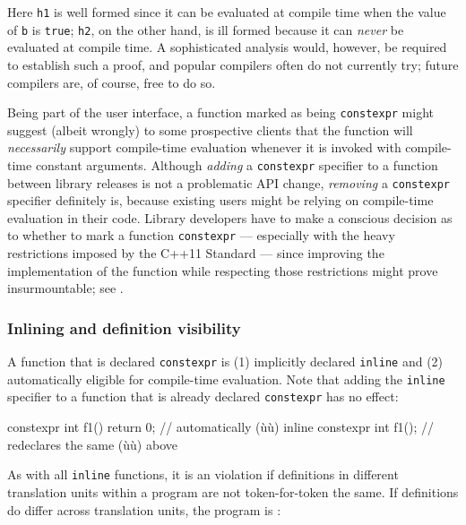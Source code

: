 \noindent Here \lstinline!h1! is well formed since it can be evaluated at compile
time when the value of \lstinline!b! is \lstinline!true!; \lstinline!h2!, on the
other hand, is ill formed because it can \emph{never} be evaluated at
compile time. A sophisticated analysis would, however, be required to
establish such a proof, and popular compilers often do not currently
try; future compilers are, of course, free to do so.

Being part of the user interface, a function marked as being
\lstinline!constexpr! might suggest (albeit wrongly) to some prospective
clients that the function will \emph{necessarily} support compile-time
evaluation whenever it is invoked with compile-time constant arguments.
Although \emph{adding} a \lstinline!constexpr! specifier to a function
between library releases is not a problematic API change,
\emph{removing} a \lstinline!constexpr! specifier definitely is, because
existing users might be relying on compile-time evaluation in their
code. Library developers have to make a conscious decision as to whether
to mark a function \lstinline!constexpr! --- especially with the heavy
restrictions imposed by the C++11 Standard --- since improving the
implementation of the function while respecting those restrictions might
prove insurmountable; see .

\subsubsection[Inlining and definition visibility]{Inlining and definition visibility}\label{inlining-and-definition-visibility}

A function that is declared \lstinline!constexpr! is (1) implicitly
declared \lstinline!inline! and (2) automatically eligible for compile-time
evaluation. Note that adding the \lstinline!inline! specifier to a function
that is already declared \lstinline!constexpr! has no effect:

\begin{emcppslisting}
       constexpr int f1() { return 0; } // automatically (ù{}ù)
inline constexpr int f1();              // redeclares the same (ù{}ù) above
\end{emcppslisting}


\noindent As with all \lstinline!inline! functions, it is an  violation if definitions in different translation units
within a program are not token-for-token the same. If definitions do
differ across translation units, the program is :

